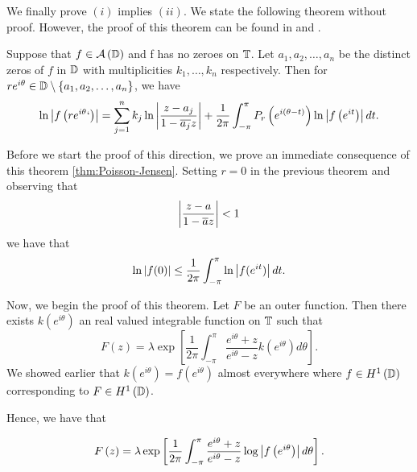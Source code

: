 We finally prove $\left( i \right)$ implies $\left( ii \right)$. We state the following theorem without proof. However, the proof of this theorem can be found in \cite{rudin1987real} and \cite{ash2014complex}.
\begin{theorem}
    Suppose that $f \in {\cal A} \left( \mathbb D \right)$ and f has no zeroes on $\mathbb T$. Let $a_{1}, a_{2}, \ldots , a_{n}$ be the distinct zeros of $f$ in $\mathbb D$ with multiplicities $k_{1}, \ldots , k_{n}$ respectively. Then for $re^{i\theta}\in \mathbb D \setminus \left\{ a_{1}, a_{2}, \ldots , a_{n} \right\}$, we have 
    \begin{equation*}
	\ln \left\lvert f\left( re^{i\theta}` \right) \right\rvert = \sum_{j=1}^{n} k_{j} \ln \left\lvert \frac{z-a_{j}}{1-\overline{a_{j}}z} \right\rvert + \frac{1}{2\pi} \int_{-\pi}^{\pi} P_{r} \left( e^{i\left( \theta-t \right)}  \right) \ln \left\lvert f\left( e^{it} \right) \right\rvert dt.
    \end{equation*}
    \label{thm:Poisson-Jensen}
\end{theorem}

Before we start the proof of this direction, we prove an immediate consequence of this theorem \ref{thm:Poisson-Jensen}. Setting $r=0$ in the previous theorem and observing that
\begin{equation*}
    \left\lvert \frac{z-a}{1-\overline{a}z} \right\rvert<1
\end{equation*} we have that
\begin{equation*}
    \ln \left\lvert f(0) \right\rvert \le \frac{1}{2\pi} \int_{-\pi}^{\pi} \ln \left\lvert f(e^{it}) \right\rvert dt.
\end{equation*}

Now, we begin the proof of this theorem. Let $F$ be an outer function. Then there exists $k\left( e^{i\theta} \right)$ an real valued integrable function on $\mathbb T$ such that 
\begin{equation*}
    F\left( z \right)=\lambda \exp \left[ \frac{1}{2\pi}  \int_{-\pi}^{\pi} \frac{e^{i\theta} + z}{e^{i\theta} - z} k\left( e^{i\theta} \right) d\theta \right].
\end{equation*}
We showed earlier that $k\left( e^{i\theta} \right) = f\left( e^{i\theta} \right)$ almost everywhere where $f \in H^{1} \left( \mathbb D \right)$ corresponding to $F\in H^{1} \left( \mathbb D \right)$.

Hence, we have that 

\begin{equation*}
    F\left( z \right)=\lambda \exp \left[ \frac{1}{2\pi}  \int_{-\pi}^{\pi} \frac{e^{i\theta} + z}{e^{i\theta} - z} \log \left\lvert f\left( e^{i\theta } \right) \right\rvert d\theta \right].
\end{equation*}


